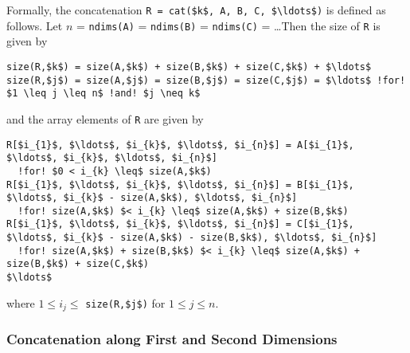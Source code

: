 Formally, the concatenation \lstinline!R = cat($k$, A, B, C, $\ldots$)! is defined as follows.  Let $n$ = \lstinline!ndims(A)! = \lstinline!ndims(B)! = \lstinline!ndims(C)! = \ldots  Then the size of \lstinline!R! is given by
\begin{lstlisting}[language=modelica,escapechar=!,frame=none,xleftmargin=1em]
size(R,$k$) = size(A,$k$) + size(B,$k$) + size(C,$k$) + $\ldots$
size(R,$j$) = size(A,$j$) = size(B,$j$) = size(C,$j$) = $\ldots$ !for! $1 \leq j \leq n$ !and! $j \neq k$
\end{lstlisting}
and the array elements of \lstinline!R! are given by
\begin{lstlisting}[language=modelica,escapechar=!,frame=none,xleftmargin=1em]
R[$i_{1}$, $\ldots$, $i_{k}$, $\ldots$, $i_{n}$] = A[$i_{1}$, $\ldots$, $i_{k}$, $\ldots$, $i_{n}$]
  !for! $0 < i_{k} \leq$ size(A,$k$)
R[$i_{1}$, $\ldots$, $i_{k}$, $\ldots$, $i_{n}$] = B[$i_{1}$, $\ldots$, $i_{k}$ - size(A,$k$), $\ldots$, $i_{n}$]
  !for! size(A,$k$) $< i_{k} \leq$ size(A,$k$) + size(B,$k$)
R[$i_{1}$, $\ldots$, $i_{k}$, $\ldots$, $i_{n}$] = C[$i_{1}$, $\ldots$, $i_{k}$ - size(A,$k$) - size(B,$k$), $\ldots$, $i_{n}$]
  !for! size(A,$k$) + size(B,$k$) $< i_{k} \leq$ size(A,$k$) + size(B,$k$) + size(C,$k$)
$\ldots$
\end{lstlisting}
where $1 \leq i_{j} \leq$ \lstinline!size(R,$j$)! for $1 \leq j \leq n$.


\subsubsection{Concatenation along First and Second Dimensions}\label{array-concatenation-along-first-and-second-dimensions}\label{concatenation-along-first-and-second-dimensions}

